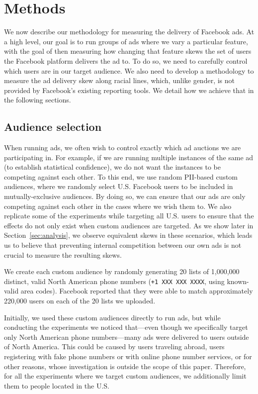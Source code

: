 \section{Methods}
We now describe our methodology for measuring the delivery of Facebook ads. 
%
At a high level, our goal is to run groups of ads where we vary a particular feature, with the goal of then measuring how changing that feature skews the set of users the Facebook platform delivers the ad to.
%
To do so, we need to carefully control which users are in our target audience.
%
We also need to develop a methodology to measure the ad delivery skew along racial lines, which, unlike gender, is not provided by Facebook's existing reporting tools.
%
We detail how we achieve that in the following sections.

\subsection{Audience selection}\label{sec:audiences}

When running ads, we often wish to control exactly which ad auctions we are participating in.  
%
For example, if we are running multiple instances of the same ad (\eg to establish statistical confidence), we do not want the instances to be competing against each other.
% 
To this end, we use random PII-based custom audiences, where we randomly select U.S. Facebook users to be included in mutually-exclusive audiences.
%
By doing so, we can ensure that our ads are only competing against each other in the cases where we wish them to.
%
We also replicate some of the experiments while targeting all U.S. users to ensure that the effects do not only exist when custom audiences are targeted. 
%
As we show later in Section~\ref{sec:analysis}, we observe equivalent skews in these scenarios, which leads us to believe that preventing internal competition between our own ads is not crucial to measure the resulting skews.

We create each custom audience by randomly generating 20 lists of 1,000,000 distinct, valid North American phone numbers (\texttt{+1 XXX XXX XXXX}, using known-valid area codes). 
%
Facebook reported that they were able to match approximately 220,000 users on each of the 20 lists we uploaded.

Initially, we used these custom audiences directly to run ads, but while conducting the experiments we noticed that---even though we specifically target only North American phone numbers---many ads were delivered to users outside of North America.
%
This could be caused by users traveling abroad, users registering with fake phone numbers or with online phone number services, or for other reasons, whose investigation is outside the scope of this paper.
%
Therefore, for all the experiments where we target custom audiences, we additionally limit them to people located in the U.S.

